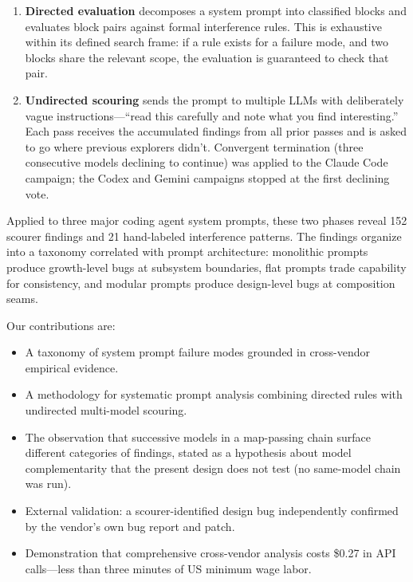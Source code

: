 \documentclass[11pt,a4paper]{article}
\begin{document}
\begin{enumerate}[leftmargin=*]
  \item \textbf{Directed evaluation} decomposes a system prompt into
    classified blocks and evaluates block pairs against formal
    interference rules. This is exhaustive within its defined search
    frame: if a rule exists for a failure mode, and two blocks share
    the relevant scope, the evaluation is guaranteed to check that pair.
  \item \textbf{Undirected scouring} sends the prompt to multiple LLMs
    with deliberately vague instructions---``read this carefully and
    note what you find interesting.'' Each pass receives the accumulated
    findings from all prior passes and is asked to go where previous
    explorers didn't. Convergent termination (three consecutive models
    declining to continue) was applied to the Claude Code campaign; the
    Codex and Gemini campaigns stopped at the first declining vote.
\end{enumerate}

Applied to three major coding agent system prompts, these two phases
reveal 152 scourer findings and 21 hand-labeled interference patterns.
The findings organize into a taxonomy correlated with prompt
architecture: monolithic prompts produce growth-level bugs at subsystem
boundaries, flat prompts trade capability for consistency, and modular
prompts produce design-level bugs at composition seams.

Our contributions are:
\begin{itemize}[leftmargin=*]
  \item A taxonomy of system prompt failure modes grounded in
    cross-vendor empirical evidence.
  \item A methodology for systematic prompt analysis combining directed
    rules with undirected multi-model scouring.
  \item The observation that successive models in a map-passing chain
    surface different categories of findings, stated as a hypothesis
    about model complementarity that the present design does not test
    (no same-model chain was run).
  \item External validation: a scourer-identified design bug
    independently confirmed by the vendor's own bug report and patch.
  \item Demonstration that comprehensive cross-vendor analysis costs
    \$0.27 in API calls---less than three minutes of US minimum wage
    labor.
\end{itemize}
\end{document}
